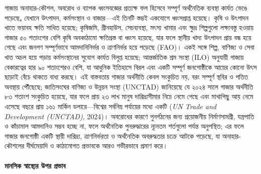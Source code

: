 গাজায় অনাহার-কৌশল, অবরোধ ও ব্যাপক ধ্বংসযজ্ঞের প্রত্যক্ষ ফল হিসেবে সম্পূর্ণ
অর্থনৈতিক ব্যবস্থা কার্যত ভেঙে পড়েছে\textbf{,} যেখানে উৎপাদন, কর্মসংস্থান ও
বাজার---এই তিনটি স্তম্ভই একযোগে ধ্বংসপ্রাপ্ত হয়েছে। কৃষি ও উৎপাদন খাতে ভয়াবহ
ক্ষতি সাধিত হয়েছে; কৃষিজমি, গ্রীনহাউস, সেচব্যবস্থা, মৎস্য খামার এবং ক্ষুদ্র
শিল্পগুলো লক্ষ্যবস্তু হওয়ায় গাজার ৫০ শতাংশের বেশি কৃষি অবকাঠামো ক্ষতিগ্রস্ত বা
ধ্বংস হয়েছে, যার ফলে স্থানীয় খাদ্য উৎপাদন প্রায় বন্ধ হয়ে গেছে এবং জনগণ
সম্পূর্ণভাবে আমদানিনির্ভর ও ত্রাণনির্ভর হয়ে পড়েছে (FAO)। একই সঙ্গে শিল্প, বাণিজ্য
ও সেবা খাত অচল হয়ে পড়ায় কর্মসংস্থানের সুযোগ কার্যত বিলুপ্ত হয়েছে; আন্তর্জাতিক
শ্রম সংস্থা (ILO) অনুযায়ী গাজায় বেকারত্বের হার ৯০ শতাংশেরও বেশি, যা আধুনিক
ইতিহাসে বিরল এবং একটি সম্পূর্ণ জনগোষ্ঠীকে আয়ের কোনো উৎস ছাড়াই বেঁচে থাকতে
বাধ্য করছে। এই বাস্তবতায় গাজার অর্থনীতি কেবল সংকুচিত নয়, বরং সম্পূর্ণ স্থবির ও
পতিত অবস্থায় পৌঁছেছে; জাতিসংঘের বাণিজ্য ও উন্নয়ন সংস্থা (UNCTAD) জানিয়েছে যে
২০২৪ সালে গাজার অর্থনীতি ৮৩ শতাংশ সংকুচিত হয়েছে, যার ফলে প্রায় ২৩ লাখ মানুষ
দারিদ্র্যসীমার নিচে নেমে গেছে এবং মাথাপিছু আয় নেমে এসেছে বছরে প্রায় ১৬১
মার্কিন ডলারে---বিশ্বের সর্বনিম্ন পর্যায়ের মধ্যে একটি (\emph{UN Trade and
Development (UNCTAD)}, 2024)। অবরোধের কারণে পুনর্গঠনের জন্য প্রয়োজনীয়
নির্মাণসামগ্রী, যন্ত্রপাতি ও কাঁচামাল আমদানিও সম্ভব হচ্ছে না, ফলে অর্থনৈতিক
পুনরুদ্ধারের ন্যূনতম শর্তগুলো পর্যন্ত অনুপস্থিত; এর ফলে গাজার জনগোষ্ঠী একটি স্থায়ী
দারিদ্র্য, ত্রাণনির্ভরতা ও অর্থনৈতিক অবরুদ্ধতার চক্রে আটকে পড়েছে, যা
অনাহার-কৌশলের দীর্ঘমেয়াদি ও কাঠামোগত প্রভাবকে আরও গভীরভাবে প্রমাণ করে।

\paragraph{ মানসিক স্বাস্থ্যের উপর
প্রভাব}\label{ux9aeux9a8ux9b8ux995-ux9b8ux9acux9b8ux9a5ux9afux9b0-ux989ux9aaux9b0-ux9aaux9b0ux9adux9ac}

